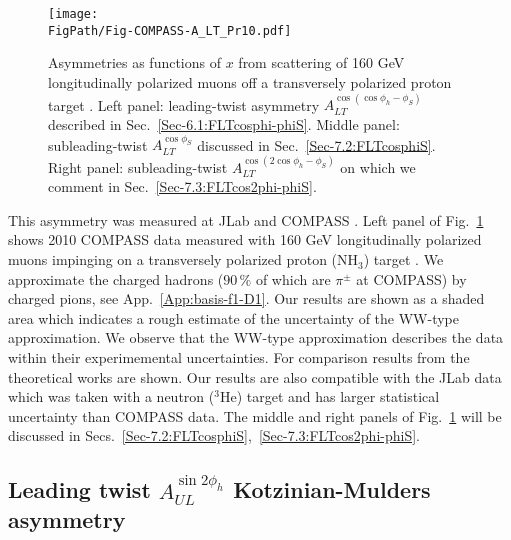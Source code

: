 \documentclass[a4paper,11pt]{article}
\newcommand*{\FigPath}{./figs}%
\begin{document}
\begin{figure}[b!]
\centering
\texttt{[image: \\FigPath/Fig-COMPASS-A\_LT\_Pr10.pdf]}
	\caption{\label{g1t_jlab} 
	Asymmetries as functions of $x$ from scattering of 160 GeV
	longitudinally polarized muons off a transversely polarized 
	proton target \cite{Parsamyan:2015dfa}.
	Left panel: 
	leading-twist asymmetry $A_{LT}^{\cos(\cos\phi_h-\phi_S)}$ 
	described in Sec.~\ref{Sec-6.1:FLTcosphi-phiS}.
	Middle panel: 
	subleading-twist $A_{LT}^{\cos\phi_S}$ 
	discussed in Sec.~\ref{Sec-7.2:FLTcosphiS}.
	Right panel: 
	subleading-twist $A_{LT}^{\cos(2\cos\phi_h-\phi_S)}$
	on which we comment in Sec.~\ref{Sec-7.3:FLTcos2phi-phiS}.}
\end{figure}

This asymmetry was measured at JLab and COMPASS 
\cite{Huang:2011bc,Parsamyan:2015dfa}. Left panel of Fig.~\ref{g1t_jlab} 
shows 2010 COMPASS data \cite{Parsamyan:2015dfa} measured with 160 GeV 
longitudinally polarized muons impinging on a transversely polarized proton 
(NH$_3$) target \cite{Goertz:2002vv}. We approximate the charged hadrons
($90\,\%$ of which are $\pi^\pm$ at COMPASS) by charged pions, see 
App.~\ref{App:basis-f1-D1}.
Our results are shown as a shaded area which indicates a rough estimate
of the uncertainty of the WW-type approximation.
We observe that the WW-type approximation describes the data within 
their experimemental uncertainties.
For comparison results from the theoretical works 
\cite{Kotzinian:2006dw,Kotzinian:2008fe,Boffi:2009sh} are shown.
Our results are also compatible with the JLab data which was 
taken with a neutron ($^3$He) target \cite{Huang:2011bc} and has 
larger statistical uncertainty than COMPASS data. The middle and right 
panels of Fig.~\ref{g1t_jlab} will be discussed in 
Secs.~\ref{Sec-7.2:FLTcosphiS},~\ref{Sec-7.3:FLTcos2phi-phiS}.



\newpage

\subsection{\boldmath 
	Leading twist $A_{UL}^{\sin2\phi_h}$ Kotzinian-Mulders  asymmetry}
	\label{Sec-6.2:FULsin2phi}
\end{document}
